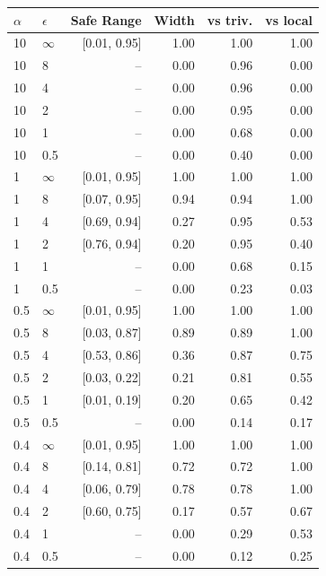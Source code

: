 \begin{tabular}{@{}llrrrr@{}}
\toprule
$\alpha$ & $\epsilon$ & Safe Range & Width & vs triv. & vs local \\
\midrule
10 & $\infty$ & [0.01, 0.95] & 1.00 & 1.00 & 1.00 \\
10 & 8 & -- & 0.00 & 0.96 & 0.00 \\
10 & 4 & -- & 0.00 & 0.96 & 0.00 \\
10 & 2 & -- & 0.00 & 0.95 & 0.00 \\
10 & 1 & -- & 0.00 & 0.68 & 0.00 \\
10 & 0.5 & -- & 0.00 & 0.40 & 0.00 \\
1 & $\infty$ & [0.01, 0.95] & 1.00 & 1.00 & 1.00 \\
1 & 8 & [0.07, 0.95] & 0.94 & 0.94 & 1.00 \\
1 & 4 & [0.69, 0.94] & 0.27 & 0.95 & 0.53 \\
1 & 2 & [0.76, 0.94] & 0.20 & 0.95 & 0.40 \\
1 & 1 & -- & 0.00 & 0.68 & 0.15 \\
1 & 0.5 & -- & 0.00 & 0.23 & 0.03 \\
0.5 & $\infty$ & [0.01, 0.95] & 1.00 & 1.00 & 1.00 \\
0.5 & 8 & [0.03, 0.87] & 0.89 & 0.89 & 1.00 \\
0.5 & 4 & [0.53, 0.86] & 0.36 & 0.87 & 0.75 \\
0.5 & 2 & [0.03, 0.22] & 0.21 & 0.81 & 0.55 \\
0.5 & 1 & [0.01, 0.19] & 0.20 & 0.65 & 0.42 \\
0.5 & 0.5 & -- & 0.00 & 0.14 & 0.17 \\
0.4 & $\infty$ & [0.01, 0.95] & 1.00 & 1.00 & 1.00 \\
0.4 & 8 & [0.14, 0.81] & 0.72 & 0.72 & 1.00 \\
0.4 & 4 & [0.06, 0.79] & 0.78 & 0.78 & 1.00 \\
0.4 & 2 & [0.60, 0.75] & 0.17 & 0.57 & 0.67 \\
0.4 & 1 & -- & 0.00 & 0.29 & 0.53 \\
0.4 & 0.5 & -- & 0.00 & 0.12 & 0.25 \\

\end{tabular}
